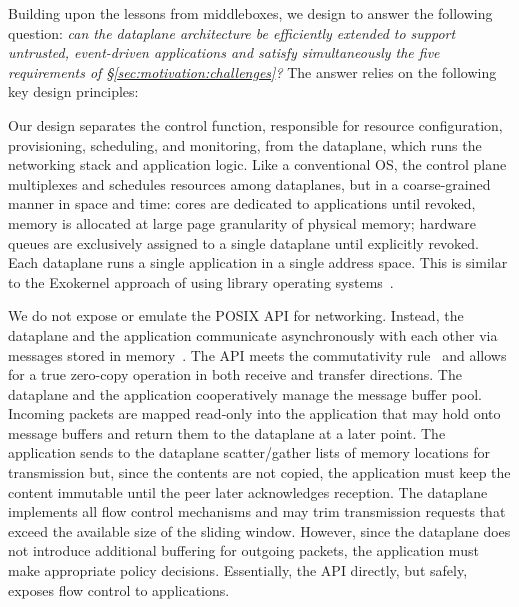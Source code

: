 
Building upon the lessons from middleboxes, we design \ix to answer
the following question: {\it {} can the dataplane architecture be
  efficiently extended to support untrusted, event-driven applications
  and satisfy simultaneously the five requirements of
  \S\ref{sec:motivation:challenges}?}  The answer relies on the
following key design principles:


Our design separates the control function, responsible for resource
configuration, provisioning, scheduling, and monitoring, from the
dataplane, which runs the networking stack and application logic.
Like a conventional OS, the control plane multiplexes and schedules
resources among dataplanes, but in a coarse-grained manner in space and
time: cores are dedicated to applications until revoked, memory is
allocated at large page granularity of physical memory; hardware queues are
exclusively assigned to a single dataplane until explicitly revoked.
Each dataplane runs a single application in a single address space.
This is similar to the Exokernel approach of using library operating
systems~\cite{DBLP:conf/sosp/EnglerKO95}.

 We do
not expose or emulate the POSIX API for networking.  Instead, the
dataplane and the application communicate asynchronously with each
other via messages stored in
memory~\cite{rizzo2012netmap,han2012megapipe}.  The API meets the
commutativity rule~\cite{DBLP:conf/sosp/ClementsKZMK13} and allows for
a true zero-copy operation in both receive and transfer
directions. The dataplane and the application cooperatively manage the
message buffer pool. Incoming packets are mapped read-only into the
application that may hold onto message buffers and return them to the
dataplane at a later point.  The application sends to the dataplane
scatter/gather lists of memory locations for transmission but, since
the contents are not copied, the application must keep the content
immutable until the peer later acknowledges reception. The dataplane
implements all flow control mechanisms and may trim transmission
requests that exceed the available size of the sliding
window. However, since the dataplane does not introduce additional
buffering for outgoing packets, the application must make appropriate
policy decisions. Essentially, the API directly, but safely, exposes
flow control to applications.


